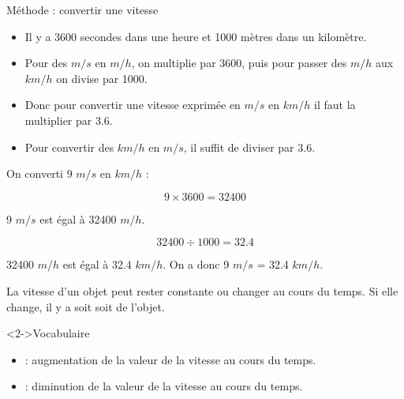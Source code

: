 \documentclass[xcolor={dvipsnames}]{beamer}
\begin{document}
\begin{frame}
	\begin{block}{Méthode : convertir une vitesse}
		
		\begin{itemize}
			\item Il y a \num{3600} secondes dans une heure et \num{1000} mètres dans un kilomètre.	\pause
			
			\item Pour des $m/s$ en $m/h$, on multiplie par \num{3600}, puis pour passer des $m/h$ aux $km/h$ on divise par \num{1000}.\pause
			
			\item Donc pour convertir une vitesse exprimée en $m/s$ en $km/h$ il faut la multiplier par  $\num{3.6}$. 
			
			\item Pour convertir des $km/h$ en $m/s$, il suffit de diviser par $\num{3.6}$.
		\end{itemize}
	\end{block}
\end{frame}


\begin{frame}
	\begin{myex}
		On converti 9 $m/s$ en $km/h$ :
		
		\begin{equation*}
		9 \times \num{3600} = \num{32400}
		\end{equation*}
		
		9 $m/s$ est égal à \num{32400} $m/h$.
		
		\begin{equation*}
		\num{32400} \div \num{1000} = \num{32.4}
		\end{equation*}
		
		\num{32400} $m/h$ est égal à \num{32.4} $km/h$. On a donc 9 $m/s$ = \num{32.4} $km/h$.
		
	\end{myex}
\end{frame}
\begin{frame}
\begin{alertblock}{}
	La vitesse d'un objet peut rester constante ou changer au cours du temps.
	Si elle change, il y a soit  soit  de l'objet. 
	
\end{alertblock}


\begin{block}<2->{\Large{Vocabulaire}}
	\begin{itemize}
		\item {} : \pause  augmentation de la valeur de la vitesse au cours du temps.\pause
		
		\item {} : \pause diminution de la valeur de la vitesse au cours du temps.
	\end{itemize}
\end{block}
		
\end{frame}
\end{document}
